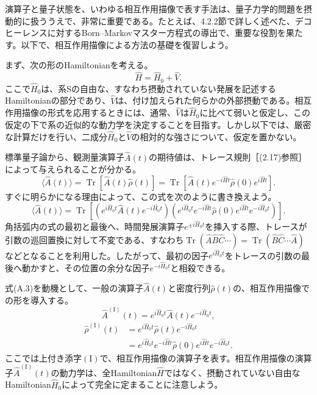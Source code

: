 \hypertarget{srcpage:379}{}\label{srcpage:379}

演算子と量子状態を、いわゆる相互作用描像で表す手法は、量子力学的問題を摂動的に扱ううえで、非常に重要である。たとえば、4.2.2節で詳しく述べた、デコヒーレンスに対するBorn--Markovマスター方程式の導出で、重要な役割を果たす。以下で、相互作用描像による方法の基礎を復習しよう。

まず、次の形のHamiltonianを考える。
\begin{equation}
\hat H=\hat H_0+\hat V.\tag{A.1}
\end{equation}
ここで$\hat H_0$は、系Sの自由な、すなわち摂動されていない発展を記述するHamiltonianの部分であり、$\hat V$は、付け加えられた何らかの外部摂動である。相互作用描像の形式を応用するときには、通常、$\hat V$は$\hat H_0$に比べて弱いと仮定し、この仮定の下で系の近似的な動力学を決定することを目指す。しかし以下では、厳密な計算だけを行い、二成分$\hat H_0$と$\hat V$の相対的な強さについて、仮定を置かない。

標準量子論から、観測量演算子$\hat A(t)$の期待値は、トレース規則［(2.17)参照］によって与えられることが分かる。
\begin{equation}
\langle\hat A(t)\rangle=\operatorname{Tr}[\hat A(t)\hat\rho(t)]
=\operatorname{Tr}[\hat A(t)e^{-i\hat Ht}\hat\rho(0)e^{i\hat Ht}].\tag{A.2}
\end{equation}
すぐに明らかになる理由によって、この式を次のように書き換えよう。
\begin{equation}
\langle\hat A(t)\rangle=\operatorname{Tr}\left[\left(e^{i\hat H_0t}\hat A(t)e^{-i\hat H_0t}\right)
\left(e^{i\hat H_0t}e^{-i\hat Ht}\hat\rho(0)e^{i\hat Ht}e^{-i\hat H_0t}\right)\right].\tag{A.3}
\end{equation}
角括弧内の式の最初と最後へ、時間発展演算子$e^{\pm i\hat H_0t}$を挿入する際、トレースが引数の巡回置換に対して不変である、すなわち$\operatorname{Tr}(\hat A\hat B\hat C\cdots)=\operatorname{Tr}(\hat B\hat C\cdots\hat A)$などとなることを利用した。したがって、最初の因子$e^{i\hat H_0t}$をトレースの引数の最後へ動かすと、その位置の余分な因子$e^{-i\hat H_0t}$と相殺できる。

\hypertarget{srcpage:380}{}\label{srcpage:380}
式(A.3)を動機として、一般の演算子$\hat A(t)$と密度行列$\hat\rho(t)$の、相互作用描像での形を導入する。
\begin{equation}
\hat A^{(\mathrm I)}(t)=e^{i\hat H_0t}\hat A(t)e^{-i\hat H_0t},\tag{A.4}
\end{equation}
\begin{equation}
\begin{aligned}
\hat\rho^{(\mathrm I)}(t)&=e^{i\hat H_0t}\hat\rho(t)e^{-i\hat H_0t}\\
&=e^{i\hat H_0t}e^{-i\hat Ht}\hat\rho(0)e^{i\hat Ht}e^{-i\hat H_0t}.
\end{aligned}\tag{A.5}
\end{equation}
ここでは上付き添字$(\mathrm I)$で、相互作用描像の演算子を表す。相互作用描像の演算子$\hat A^{(\mathrm I)}(t)$の動力学は、全Hamiltonian$\hat H$ではなく、摂動されていない自由なHamiltonian$\hat H_0$によって完全に定まることに注意しよう。

